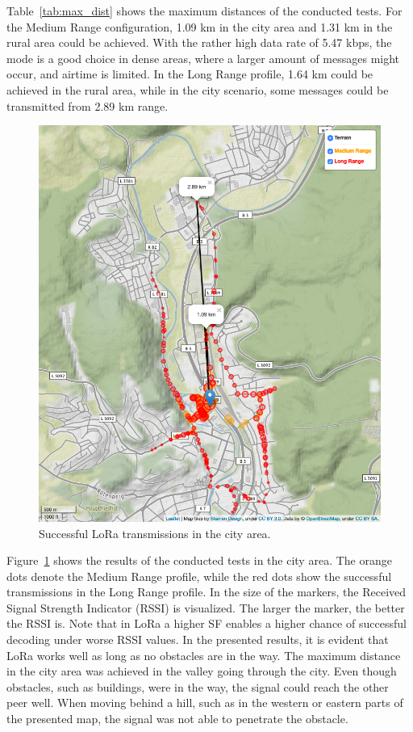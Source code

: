 Table~\ref{tab:max_dist} shows the maximum distances of the conducted tests.
For the Medium Range configuration, 1.09 km in the city area and 1.31 km in the rural area could be achieved.
With the rather high data rate of 5.47 kbps, the mode is a good choice in dense areas, where a larger amount of messages might occur, and airtime is limited.
In the Long Range profile, 1.64 km could be achieved in the rural area, while in the city scenario, some messages could be transmitted from 2.89 km range.

\begin{figure}[ht!]
    \centering
    \includegraphics[width=\textwidth]{gfx/city.png}
    \caption{Successful LoRa transmissions in the city area.}
    \label{fig:eval_city_new}
\end{figure}

Figure~\ref{fig:eval_city_new} shows the results of the conducted tests in the city area.
The orange dots denote the Medium Range profile, while the red dots show the successful transmissions in the Long Range profile.
In the size of the markers, the Received Signal Strength Indicator (RSSI) is visualized. The larger the marker, the better the RSSI is. 
Note that in LoRa a higher SF enables a higher chance of successful decoding under worse RSSI values.
In the presented results, it is evident that LoRa works well as long as no obstacles are in the way. 
The maximum distance in the city area was achieved in the valley going through the city. 
Even though obstacles, such as buildings, were in the way, the signal could reach the other peer well.
When moving behind a hill, such as in the western or eastern parts of the presented map, the signal was not able to penetrate the obstacle.

